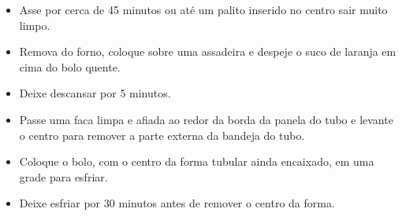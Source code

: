\documentclass [11pt, letterpaper] {article}
\begin{document}
\begin {description}
\begin {enumerate}
\begin {itemize}
\item Asse por cerca de 45 minutos ou até um palito inserido no centro sair muito limpo.
\item Remova do forno, coloque sobre uma assadeira e despeje o suco de laranja em cima do bolo quente.
\item Deixe descansar por 5 minutos.
\item Passe uma faca limpa e afiada ao redor da borda da panela do tubo e levante o centro para remover a parte externa da bandeja do tubo.
\item Coloque o bolo, com o centro da forma tubular ainda encaixado, em uma grade para esfriar.
\item Deixe esfriar por 30 minutos antes de remover o centro da forma.
\end {itemize}
\end {enumerate}
\end {description}
\end{document}
